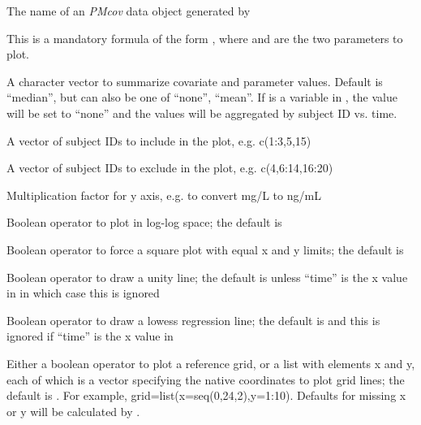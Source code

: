 \documentclass[a4paper]{book}
\begin{document}
\begin{Arguments}
\begin{ldescription}
\item[\code{x}] The name of an \emph{PMcov} data object generated by 

\item[\code{formula}] This is a mandatory formula of the form , where  and 
are the two  parameters to plot.

\item[\code{icen}] A character vector to summarize covariate and parameter values.  Default is ``median'', but can also be one of ``none'',
``mean''.  If  is a variable in , the value will be set to ``none'' and the  values
will be aggregated by subject ID vs. time.

\item[\code{include}] A vector of subject IDs to include in the plot, e.g. c(1:3,5,15)

\item[\code{exclude}] A vector of subject IDs to exclude in the plot, e.g. c(4,6:14,16:20)

\item[\code{mult}] Multiplication factor for y axis, e.g. to convert mg/L to ng/mL

\item[\code{log}] Boolean operator to plot in log-log space; the default is 

\item[\code{square}] Boolean operator to force a square plot with equal x and y limits; the default is 

\item[\code{ref}] Boolean operator to draw a unity line; the default is  unless ``time'' is the x value in  in which case this is ignored

\item[\code{lowess}] Boolean operator to draw a lowess regression line; the default is  and this is ignored if ``time'' is the x value in 

\item[\code{grid}] Either a boolean operator to plot a reference grid, or a list with elements x and y,
each of which is a vector specifying the native coordinates to plot grid lines; the default is .
For example, grid=list(x=seq(0,24,2),y=1:10).  Defaults for missing x or y will be calculated by .


\end{ldescription}
\end{Arguments}
\end{document}

